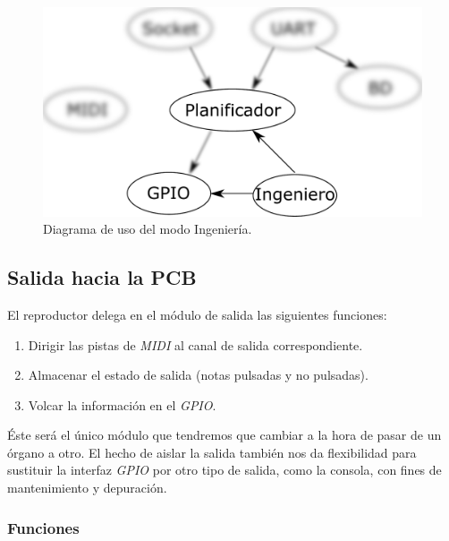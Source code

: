 \smallskip

\begin{figure}[H]
	\noindent \begin{centering}
		\includegraphics[width=\linewidth/2]{capitulo4/daemon_engineer}
		\par\end{centering}
	\smallskip
	\caption{\label{fig:daemon_engineer} Diagrama de uso del modo Ingeniería.}
\end{figure} 

\smallskip

\subsection{Salida hacia la PCB}
\label{subsec:output}

El reproductor delega en el módulo de salida las siguientes funciones:

\begin{enumerate}
	\item Dirigir las pistas de \textit{MIDI} al canal de salida correspondiente.
	\item Almacenar el estado de salida (notas pulsadas y no pulsadas).
	\item Volcar la información en el \textit{GPIO}.
\end{enumerate}

Éste será el único módulo que tendremos que cambiar a la hora de pasar de un órgano a otro. El hecho de aislar la salida también nos da flexibilidad para sustituir la interfaz \textit{GPIO} por otro tipo de salida, como la consola, con fines de mantenimiento y depuración.

\subsubsection{Funciones}

